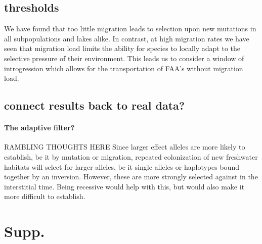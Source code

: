 \documentclass{article}
\begin{document}

\subsection*{thresholds}

We have found that too little migration leads to selection upon new mutations in all subpopulations and lakes alike. 
In contrast, at high migration rates we have seen that migration load limits 
the ability for species to locally adapt to the selective pressure of their environment.
This leads us to consider a window of introgression which allows for the transportation
of FAA's without migration load. 

\subsection*{connect results back to real data?}



\paragraph{The adaptive filter?}
RAMBLING THOUGHTS HERE
Since larger effect alleles are more likely to establish,
be it by mutation or migration,
repeated colonization of new freshwater habitats will select for larger alleles,
be it single alleles or haplotypes bound together by an inversion.
However, these are more strongly selected against in the interstitial time.
Being recessive would help with this,
but would also make it more difficult to establish.


{}

\clearpage
\appendix
\section{Supp.}
\end{document}
